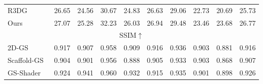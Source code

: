 \begin{table*}[h]
{\begin{tabular}{lccccccccc}
R3DG~\cite{gao2023relightable}    &  26.65                    & 24.56                    &   30.67                 &  \cellcolor{yzythird}24.83                  &   26.63                      &  29.06                   &    \cellcolor{yzythird}22.73                  &   20.69  &  25.73                                                                                                                                                                                                                                                                     \\

Ours & \cellcolor{yzysecond}27.07                          & \cellcolor{yzysecond}25.28                          & \cellcolor{yzybest}32.23                         & \cellcolor{yzysecond}26.03           & \cellcolor{yzybest}26.94                             & \cellcolor{yzysecond}29.48                       & 23.46                 & \cellcolor{yzybest}23.68  &  \cellcolor{yzysecond}26.77                          \\ \hline 





\multicolumn{10}{c}{SSIM$\uparrow$}                                                                                                                                                                                                                                            \\ \hline
2D-GS~\cite{Huang2DGS2024}        & \cellcolor{yzythird}0.917                     & \cellcolor{yzythird}0.907                     & \cellcolor{yzythird}0.958                    & \cellcolor{yzythird}0.909                   & \cellcolor{yzysecond}0.916              & \cellcolor{yzybest}0.936                    & \cellcolor{yzybest}0.903                      & \cellcolor{yzysecond}0.881   &  \cellcolor{yzythird}0.916                          \\

Scaffold-GS~\cite{lu2024scaffold}      & 0.904                     & 0.901                     & 0.956                    & 0.888                  & 0.905                         & \cellcolor{yzythird}0.933                    & \cellcolor{yzybest}0.903                      & \cellcolor{yzythird}0.868 & 0.907                            \\

GS-Shader~\cite{jiang2024gaussianshader}    & \cellcolor{yzybest}0.924                     & \cellcolor{yzybest}0.941                     & \cellcolor{yzysecond}0.960                    & \cellcolor{yzybest}0.932                   & \cellcolor{yzythird}0.915                         & \cellcolor{yzysecond}0.935                   & \cellcolor{yzysecond}0.901                      & \cellcolor{yzybest}0.898    &  \cellcolor{yzybest}0.926                        \\


\end{tabular}}
\end{table*}
